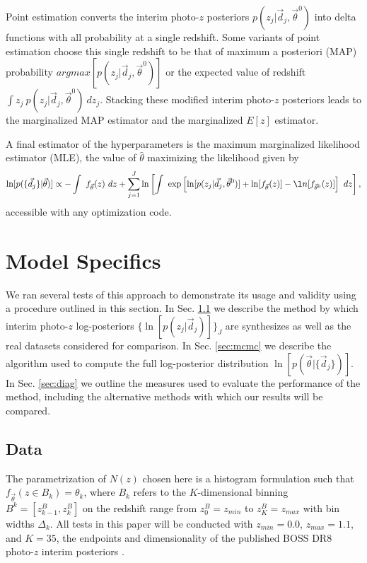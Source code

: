 \documentclass[preprint]{aastex}
\begin{document}
Point estimation converts the interim photo-$z$ posteriors 
$p(z_{j}|\vec{d}_{j},\vec{\theta}^{0})$ into delta functions with all 
probability at a single redshift.  Some variants of point estimation choose 
this single redshift to be that of maximum a posteriori (MAP) probability 
$argmax[p(z_{j}|\vec{d}_{j},\vec{\theta}^{0})]$ or the expected value of 
redshift $\int z_{j}\ p(z_{j}|\vec{d}_{j},\vec{\theta}^{0})\ dz_{j}$.  Stacking 
these modified interim photo-$z$ posteriors leads to the marginalized MAP 
estimator and the marginalized $E[z]$ estimator.

A final estimator of the hyperparameters is the maximum marginalized likelihood 
estimator (MLE), the value of $\hat{\theta}$ maximizing the likelihood given by 
\begin{equation}
\label{eq:mmle}
\ln[p(\{\vec{d}_{j}\}|\vec{\theta})] \propto -\int\ f_{\vec{\theta}}(z)\ 
dz+\sum_{j=1}^{J}\ln\left[\int\ 
\exp\left[\ln[p(z_{j}|\vec{d}_{j},\vec{\theta}^{0})]+\ln[f_{\vec{\theta}}(z)]-\l
n[f_{\vec{\theta}^{0}}(z)]\right]\ dz\right],
\end{equation}
accessible with any optimization code.

\section{Model Specifics}
\label{sec:exp}

We ran several tests of this approach to demonstrate its usage and validity 
using a procedure outlined in this section.  In Sec. \ref{sec:alldata} we 
describe the method by which interim photo-$z$ log-posteriors 
$\{\ln[p(z_{j}|\vec{d}_{j})]\}_{J}$ are synthesizes as well as the real 
datasets considered for comparison.  In Sec. \ref{sec:mcmc} we describe the 
algorithm used to compute the full log-posterior distribution 
$\ln[p(\vec{\theta}|\{\vec{d}_{j}\})]$.  In Sec. \ref{sec:diag} we outline the 
measures used to evaluate the performance of the method, including the 
alternative methods with which our results will be compared.

\subsection{Data}
\label{sec:alldata}

The parametrization of $N(z)$ chosen here is a histogram formulation such that 
$f_{\vec{\theta}}(z\in B_{k})=\theta_{k}$, where $B_{k}$ refers to the 
$K$-dimensional binning $B^{k}=[z^{B}_{k-1},z^{B}_{k}]$ on the redshift range 
from $z^{B}_{0}=z_{min}$ to $z^{B}_{K}=z_{max}$ with bin widths $\Delta_{k}$.  
All tests in this paper will be conducted with $z_{min}=0.0$, $z_{max}=1.1$, 
and $K=35$, the endpoints and dimensionality of the published BOSS DR8 
photo-$z$ interim posteriors \citet{Sheldon2012}.
\end{document}
